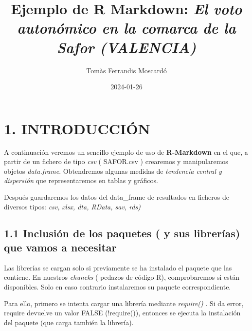 \documentclass[
]{article}
\title{Ejemplo de R Markdown: \emph{El voto autonómico en la comarca de
la Safor (VALENCIA)}}
\author{Tomàs Ferrandis Moscardó}
\date{2024-01-26}
\begin{document}
\maketitle

{
\setcounter{tocdepth}{2}
\tableofcontents
}
\hypertarget{introducciuxf3n}{%
\section{1. INTRODUCCIÓN}\label{introducciuxf3n}}

A continuación veremos un sencillo ejemplo de uso de \textbf{R-Markdown}
en el que, a partir de un fichero de tipo \emph{csv} ( SAFOR.csv )
crearemos y manipularemos objetos \emph{data.frame}. Obtendremos algunas
medidas de \emph{tendencia central y dispersión} que representaremos en
tablas y gráficos.

Después guardaremos los datos del data\_frame de resultados en ficheros
de diversos tipos: \emph{csv, xlsx, dta, RData, sav, rds)}

\hypertarget{inclusiuxf3n-de-los-paquetes-y-sus-libreruxedas-que-vamos-a-necesitar}{%
\subsection{1.1 Inclusión de los paquetes ( y sus librerías) que vamos a
necesitar}\label{inclusiuxf3n-de-los-paquetes-y-sus-libreruxedas-que-vamos-a-necesitar}}

Las librerías se cargan solo si previamente se ha instalado el paquete
que las contiene. En nuestros \emph{chuncks} ( pedazos de código R),
comprobaremos si están disponibles. Solo en caso contrario instalaremos
su paquete correspondiente.

Para ello, primero se intenta cargar una librería mediante
\emph{require()} . Si da error, require devuelve un valor FALSE
(!require()), entonces se ejecuta la instalación del paquete (que carga
también la librería).
\end{document}
